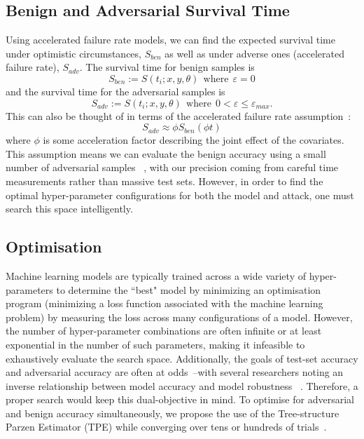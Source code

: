 \documentclass[journal]{IEEEtran}
\begin{document}
\subsection{Benign and Adversarial Survival Time}
\label{accelerated}
Using accelerated failure rate models, we can find the expected survival time under optimistic circumstances, $S_{ben}$ as well as under adverse ones (accelerated failure rate), $S_{adv}$. The survival time for benign samples is
$$
    S_{ben} := S(t_i; x, y, \theta) \mathrm{~~where~~} \varepsilon = 0
$$
and the survival time for the adversarial samples is
$$
    S_{adv} :=  S(t_i; x, y, \theta) \mathrm{~~where~~} 0 < \varepsilon \leq \varepsilon_{max}.
$$
This can also be thought of in terms of the accelerated failure rate assumption~\cite{kleinbaum1996survival}:
\begin{equation}
S_{adv} \approx  \phi S_{ben}(\phi t)
\label{assumption}
\end{equation}
where $\phi$ is some acceleration factor describing the joint effect of the covariates. This assumption means we can evaluate the benign accuracy using a small number of adversarial samples ~\cite{kleinbaum1996survival}, with our precision coming from careful time measurements rather than massive test sets.
However, in order to find the optimal hyper-parameter configurations for both the model and attack, one must search this space intelligently.


\subsection{Optimisation}
\label{optimisation}
Machine learning models are typically trained across a wide variety of hyper-parameters to determine the ``best" model by minimizing an optimisation program (minimizing a loss function associated with the machine learning problem) by measuring the loss across many configurations of a model. However, the number of hyper-parameter combinations are often infinite or at least exponential in the number of such parameters,
making it infeasible to exhaustively evaluate the search space. Additionally, the goals of test-set accuracy and adversarial accuracy are often at odds~\cite{carlini_towards_2017}--with several researchers noting an inverse relationship between model accuracy and model robustness ~\cite{carlini_towards_2017,meyers,dohmatob_generalized_2019}. Therefore, a proper search would keep this dual-objective in mind.
To optimise for adversarial and benign accuracy simultaneously, we propose the use of the Tree-structure Parzen Estimator (TPE) while converging  over tens or hundreds of trials~\cite{ozaki2020multiobjective}.
\end{document}
